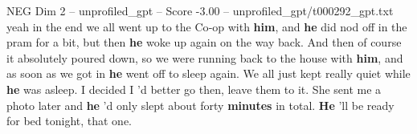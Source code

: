 \begin{textsample}{NEG Dim 2 – unprofiled\_gpt – Score -3.00 – unprofiled\_gpt/t000292\_gpt.txt}  \label{ex:f2_neg_022}
yeah in the end we all went up to the Co‑op with \textbf{him}, and \textbf{he} did nod off in the pram for a bit, but then \textbf{he} woke up again on the way back.
And then of course it absolutely poured down, so we were running back to the house with \textbf{him}, and as soon as we got in \textbf{he} went off to sleep again.
We all just kept really quiet while \textbf{he} was asleep.
I decided I ’d better go then, leave them to it.
She sent me a photo later and \textbf{he} ’d only slept about forty \textbf{minutes} in total. \textbf{He} ’ll be ready for bed tonight, that one.

\end{textsample}
